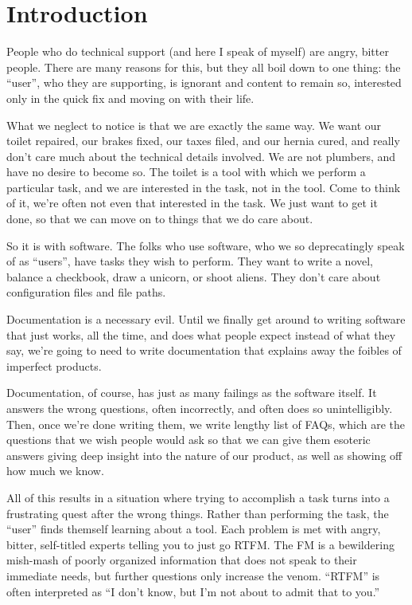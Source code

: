 \chapter{Introduction}

People who do technical support (and here I speak of myself)
are angry, bitter people. There are many
reasons for this, but they all boil down to one thing: the ``user'', who
they are supporting, is ignorant and content to remain so, interested
only in the quick fix and moving on with their life.

What we neglect to notice is that we are exactly the same way. We want
our toilet repaired, our brakes fixed, our taxes filed, and our hernia
cured, and really don't care much about the technical details involved.
We are not plumbers, and have no desire to become so. The toilet is a tool
with which we perform a particular task, and we are interested in the
task, not in the tool. Come to think of it, we're often not even that
interested in the task. We just want to get it done, so that we can move
on to things that we do care about.

So it is with software. The folks who use software, who we so
deprecatingly speak of as ``users'', have tasks they wish to perform.
They want to write a novel, balance a checkbook, draw a unicorn, or
shoot aliens. They don't care about configuration files and file paths.

Documentation is a necessary evil. Until we finally get around to
writing software that just works, all the time, and does what people
expect instead of what they say, we're going to need to write
documentation that explains away the foibles of imperfect products.

Documentation, of course, has just as many failings as the software
itself. It answers the wrong questions, often incorrectly, and often
does so unintelligibly. Then, once we're done writing them, we write
lengthy list of FAQs, which are the questions that we wish people would
ask so that we can give them esoteric answers giving deep insight into
the nature of our product, as well as showing off how much we know.

All of this results in a situation where trying to accomplish a task
turns into a frustrating quest after the wrong things. Rather than 
performing the task, the ``user'' finds themself learning about a tool.
Each problem is met with angry, bitter,
self-titled experts telling you to just go RTFM. The FM
is a bewildering mish-mash of poorly organized information that does not
speak to their immediate needs, but further questions only increase the
venom. ``RTFM'' is often interpreted as ``I don't know, but I'm not
about to admit that to you.''

